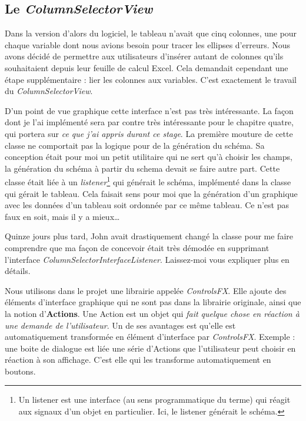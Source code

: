 %
%
\subsection{Le \textit{ColumnSelectorView}}
Dans la version d'alors du logiciel, le tableau n'avait que cinq colonnes, une pour chaque variable dont nous avions besoin pour tracer les ellipses d'erreurs. Nous avons décidé de permettre aux utilisateurs d'insérer autant de colonnes qu'ils souhaitaient depuis leur feuille de calcul Excel. Cela demandait cependant une étape supplémentaire : lier les colonnes aux variables. C'est exactement le travail du \textit{ColumnSelectorView}. 


D'un point de vue graphique cette interface n'est pas très intéressante. La façon dont je l'ai implémenté sera par contre très intéressante pour le chapitre quatre, qui portera sur \textit{ce que j'ai appris durant ce stage}. La première mouture de cette classe ne comportait pas la logique pour de la génération du schéma. Sa conception était pour moi un petit utilitaire qui ne sert qu'à choisir les champs, la génération du schéma à partir du schema devait se faire autre part. Cette classe était liée à un \textit{listener}\footnote{Un listener est une interface (au sens programmatique du terme) qui réagit aux signaux d'un objet en particulier. Ici, le listener générait le schéma.} qui générait le schéma, implémenté dans la classe qui gérait le tableau. Cela faisait sens pour moi que la génération d'un graphique avec les données d'un tableau soit ordonnée par ce même tableau. Ce n'est pas faux en soit, mais il y a mieux\ldots


Quinze jours plus tard, John avait drastiquement changé la classe pour me faire comprendre que ma façon de concevoir était très démodée en supprimant l'interface \textit{ColumnSelectorInterfaceListener}.
Laissez-moi vous expliquer plus en détails.

Nous utilisons dans le projet une librairie appelée \textit{ControlsFX}. Elle ajoute des éléments d'interface graphique qui ne sont pas dans la librairie originale, ainsi que la notion d'\textbf{Actions}. Une Action est un objet qui \textit{fait quelque chose en réaction à une demande de l'utilisateur}. Un de ses avantages est qu'elle est automatiquement transformée en élément d'interface par \textit{ControlsFX}. Exemple : une boite de dialogue est liée une série d'Actions que l'utilisateur peut choisir en réaction à son affichage. C'est elle qui les transforme automatiquement en boutons.

